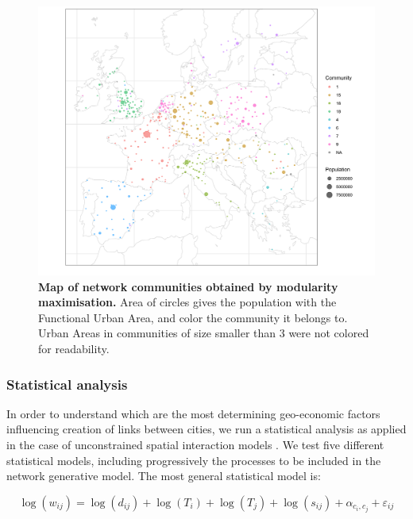 \documentclass[10pt,letterpaper]{article}
\begin{document}
\begin{figure}
    \begin{center}
    \includegraphics[width=\linewidth]{figures/Fig2.png}
    \end{center}
    \caption{{\bf Map of network communities obtained by modularity maximisation.} Area of circles gives the population with the Functional Urban Area, and color the community it belongs to. Urban Areas in communities of size smaller than 3 were not colored for readability.}
    \label{fig:fig2}
\end{figure}


\subsubsection*{Statistical analysis}

In order to understand which are the most determining geo-economic factors influencing creation of links between cities, we run a statistical analysis as applied in the case of unconstrained spatial interaction models \cite{wilson1975some}. We test five different statistical models, including progressively the processes to be included in the network generative model. The most general statistical model is:

\begin{equation}
\log(w_{ij}) = \log(d_{ij}) + \log(T_i) + \log(T_j) + \log(s_{ij}) + \alpha_{c_i,c_j} + \varepsilon_{ij}
\end{equation}
\end{document}
